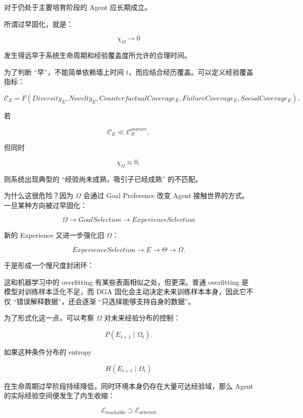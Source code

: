 对于仍处于主要培育阶段的 Agent 应长期成立。

所谓过早固化，就是：

\[
\chi_{\Omega}
\rightarrow 0
\]

发生得远早于系统生命周期和经验覆盖度所允许的合理时间。

为了判断 ``早''，不能简单依赖墙上时间 $t$，而应结合经历覆盖。可以定义经验覆盖指标：

\[
\mathcal C_E
=
F
(
Diversity_E,
Novelty_E,
CounterfactualCoverage_E,
FailureCoverage_E,
SocialCoverage_E
).
\]

若

\[
\mathcal C_E
\ll
\mathcal C_E^{mature},
\]

但同时

\[
\chi_{\Omega}\approx0,
\]

则系统出现典型的 ``经验尚未成熟，吸引子已经成熟'' 的不匹配。

为什么这很危险？因为 $\Omega$ 会通过 Goal Preference 改变 Agent 接触世界的方式。一旦某种方向被过早固化：

\[
\Omega
\rightarrow
GoalSelection
\rightarrow
ExperienceSelection
\]

新的 Experience 又进一步强化旧 $\Omega$：

\[
ExperienceSelection
\rightarrow
E
\rightarrow
\Theta
\rightarrow
\Omega.
\]

于是形成一个慢尺度封闭环：

\begin{statementbox}
\centering
{}
\end{statementbox}

这和机器学习中的 overfitting 有某些表面相似之处，但更深。普通 overfitting 是模型对训练样本泛化不足，而 DGA 固化会主动决定未来训练样本本身，因此它不仅 ``错误解释数据''，还会逐渐 ``只选择能够支持自身的数据''。

为了形式化这一点，可以考察 $\Omega$ 对未来经验分布的控制：

\[
P(E_{t+1}\mid\Omega_t).
\]

如果这种条件分布的 entropy

\[
H(E_{t+1}\mid\Omega_t)
\]

在生命周期过早阶段持续降低，同时环境本身仍存在大量可达经验域，那么 Agent 的实际经验空间便发生了内生收缩：

\[
\mathcal E_{\mathrm{reachable}}
\supset
\mathcal E_{\mathrm{selected}}
\]

